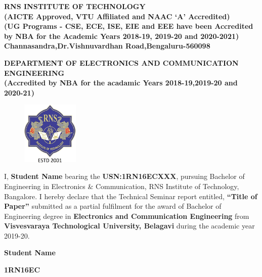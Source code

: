 %
\setlength{\toptafiddle}{1in}
\setlength{\bottafiddle}{1in}
\vspace*{-0.5in}
\enlargethispage{\bottafiddle}
\thispagestyle{empty}


\begin{center}
\small\textbf{\color{blue}	RNS INSTITUTE OF TECHNOLOGY\\
(AICTE Approved, VTU Affiliated and NAAC `A' Accredited)\\
(UG Programs - CSE, ECE, ISE, EIE and EEE have been Accredited by NBA for the Academic Years 2018-19, 2019-20 and 2020-2021)\\
Channasandra,Dr.Vishnuvardhan Road,Bengaluru-560098}\\
\vspace{0.3cm}

\small\textbf{DEPARTMENT OF ELECTRONICS AND COMMUNICATION ENGINEERING\\
(Accredited by NBA for the acadamic Years 2018-19,2019-20 and 2020-21)
}
\end{center}

\begin{center}
\begin{figure}[h]
\centering
\includegraphics[height=3cm]{images/rns1.jpg}
\end{figure}
\Large{\textbf{\color{red}{DECLARATION}}}
\end{center}

I, \textbf{Student Name} bearing the \textbf{USN:1RN16ECXXX}, pursuing Bachelor of\\ Engineering in Electronics \& Communication, RNS Institute of Technology, Bangalore. I hereby declare that the Technical Seminar report entitled, \textbf{“Title of Paper”} submitted as a partial fulfilment for the award of Bachelor of Engineering degree in \textbf{\color{blue}Electronics and Communication Engineering} from \textbf{\color{blue}Visvesvaraya Technological University, Belagavi} during the academic year 2019-20.


\vspace{1.5cm}

\begin{flushright}\textbf{Student Name}\end{flushright}
\begin{flushright}\small\textbf{1RN16EC}\end{flushright}
